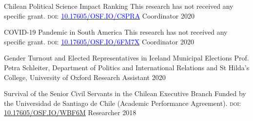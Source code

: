 






\vspace{1mm}

\begin{cvhonors}
\cvhonor
{Chilean Political Science Impact Ranking} 
{This research has not received any specific grant. {\scshape doi:} \href{http://doi.org/10.17605/OSF.IO/C8PRA}{\textcolor{blue}{10.17605/OSF.IO/C8PRA}}} 
{Coordinator}
{2020}
\end{cvhonors}

\vspace{1mm}

\begin{cvhonors}
\cvhonor
{COVID-19 Pandemic in South America}
{This research has not received any specific grant. {\scshape doi:} \href{http://doi.org/10.17605/OSF.IO/6FM7X}{\textcolor{blue}{10.17605/OSF.IO/6FM7X}}}
{Coordinator}
{2020}
\end{cvhonors}

\vspace{1mm}

\begin{cvhonors}
\cvhonor
{Gender Turnout and Elected Representatives in Iceland Municipal Elections}
{Prof. Petra Schleiter, Department of Politics and International Relations and St Hilda's College, University of Oxford}
{Research Assistant}
{2020}
\end{cvhonors}

\vspace{1mm}

\begin{cvhonors}
\cvhonor
{Survival of the Senior Civil Servants in the Chilean Executive Branch}
{Funded by the Universidad de Santiago de Chile (Academic Performance Agreement). {\scshape doi:} \href{http://doi.org/10.17605/OSF.IO/WBF6M}{10.17605/OSF.IO/WBF6M}}
{Researcher}
{2018}
\end{cvhonors}

